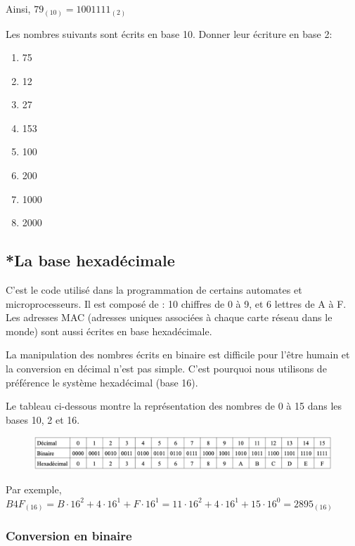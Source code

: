 \documentclass[11pt, a4paper]{book}
\begin{document}
Ainsi, $79_{(10)}=1001111_{(2)}$

\begin{exercice}
Les nombres suivants sont écrits en base 10. Donner leur écriture en base 2:
\begin{multicols}{2}
\begin{enumerate}
\item 75
\item 12
\item 27
\item 153
\item 100
\item 200
\item 1000
\item 2000
\end{enumerate}
\end{multicols}
\end{exercice}

\subsection{*La base hexadécimale}

C'est le code utilisé dans la programmation de certains automates et microprocesseurs. Il est composé de : 10 chiffres de 0 à 9, et 6 lettres de A à F. Les adresses MAC (adresses uniques associées à chaque carte réseau dans le monde) sont aussi écrites en base hexadécimale.

La manipulation des nombres écrits en binaire est difficile pour l'être humain et la conversion en décimal n'est pas simple. C'est pourquoi nous utilisons de préférence le système hexadécimal (base 16). 

Le tableau ci-dessous montre la représentation des nombres de 0 à 15 dans les bases 10, 2 et 16.

\begin{figure}[h]
\begin{center}
\includegraphics[scale=.5]{images/tableaubase}
\end{center}
\end{figure}


Par exemple, $B4F_{(16)}= B \cdot 16^2 + 4 \cdot 16^1 + F\cdot 16^1= 11 \cdot 16^2 + 4 \cdot 16^1 + 15\cdot 16^0=2 895_{(16)}$

\subsubsection{Conversion en binaire}
\end{document}
